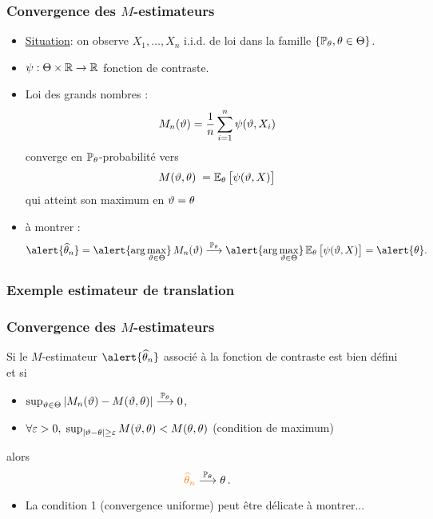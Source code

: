 \begin{frame}
\frametitle{Convergence des $M$-estimateurs}
\begin{itemize}
\item \underline{Situation}: on observe $X_1,\ldots, X_n$ i.i.d. de loi dans la famille $\{\operatorname{{\mathbb P}}_\theta, \theta \in \Theta\}$.
\item $\psi:\Theta \times \operatorname{{\mathbb R}} \rightarrow \operatorname{{\mathbb R}}$ \alert{fonction de contraste}.
\item \alert{Loi des grands nombres :}
$$
M_n(\vartheta)=\frac{1}{n}\sum_{i = 1}^n \psi(\vartheta,X_i)
$$
converge en $\operatorname{{\mathbb P}}_\theta$-probabilité vers
$$M(\vartheta,\theta)\;=\operatorname{{\mathbb E}}_\theta\big[\psi(\vartheta,X)\big]$$
\alert{ qui atteint son maximum en $\vartheta=\theta$}
\item \og à montrer\fg{} :
$$\alert{\est}= \alert{
\arg \max_{\curtheta \in \Theta}}\, M_n(\curtheta)
\stackrel{\PP_\truetheta}{\longrightarrow} \alert{\arg \max_{\curtheta
\in \Theta}}
\E_\truetheta\big[\psi(\curtheta,X)\big]=\alert{\truetheta}.$$
\end{itemize}
\end{frame}

\begin{frame}
\frametitle{Exemple estimateur de translation}

\end{frame}

\begin{frame}
\frametitle{Convergence des $M$-estimateurs}
\begin{prop}
Si le $M$-estimateur $\alert{\est}$ associé à la fonction de contraste est bien défini et si
\begin{itemize}
\item $\sup_{\vartheta \in \Theta}|M_n(\vartheta)-M(\vartheta,\theta)| \stackrel{\operatorname{{\mathbb P}}_\theta}{\longrightarrow} 0$,
\item $\forall \varepsilon >0, \;\sup_{|\vartheta-\theta| \geq \varepsilon}M(\vartheta,\theta)<M(\theta,\theta)$ \alert{(condition de maximum)}
\end{itemize}
alors 
$$
\tco{\est} \stackrel{\PP_\truetheta}{\longrightarrow} \truetheta \eqsp.
$$
\end{prop}
\begin{itemize}
\item La condition 1 (convergence uniforme) peut être délicate à montrer...
\end{itemize}
\end{frame}

